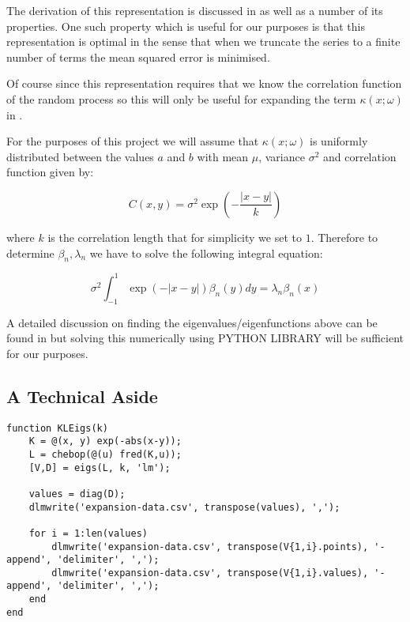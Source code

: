 The derivation of this representation is discussed in \cite{stochastic-fem} as
well as a number of its properties. One such property which is useful for our
purposes is that this representation is optimal in the sense that when we
truncate the series to a finite number of terms the mean squared error is
minimised.

Of course since this representation requires that we know the correlation
function of the random process so this will only be useful for expanding the
term $\kappa(x;\omega)$ in .

For the purposes of this project we will assume that $\kappa(x;\omega)$ is
uniformly distributed between the values $a$ and $b$ with mean $\mu$,
variance $\sigma^2$ and correlation function given by:

\begin{equation}
    C(x, y) = \sigma^2\exp\left(-\frac{|x - y|}{k}\right)
\end{equation}

where $k$ is the correlation length that for simplicity we set to $1$.
Therefore to determine $\beta_n, \lambda_n$ we have to solve the following
integral equation:

\begin{equation}
    \sigma^2\int_{-1}^1\exp(-|x - y|)\beta_n(y) dy = \lambda_n\beta_n(x)
\end{equation}

A detailed discussion on finding the eigenvalues/eigenfunctions above can be
found in \cite{stochastic-fem} but solving this numerically using
 PYTHON LIBRARY
will be sufficient for our purposes.

\subsection{A Technical Aside}

\cite{chebfun-matlab}

\begin{lstlisting}
function KLEigs(k)
    K = @(x, y) exp(-abs(x-y));
    L = chebop(@(u) fred(K,u));
    [V,D] = eigs(L, k, 'lm');

    values = diag(D);
    dlmwrite('expansion-data.csv', transpose(values), ',');

    for i = 1:len(values)
        dlmwrite('expansion-data.csv', transpose(V{1,i}.points), '-append', 'delimiter', ',');
        dlmwrite('expansion-data.csv', transpose(V{1,i}.values), '-append', 'delimiter', ',');
    end
end
\end{lstlisting}

